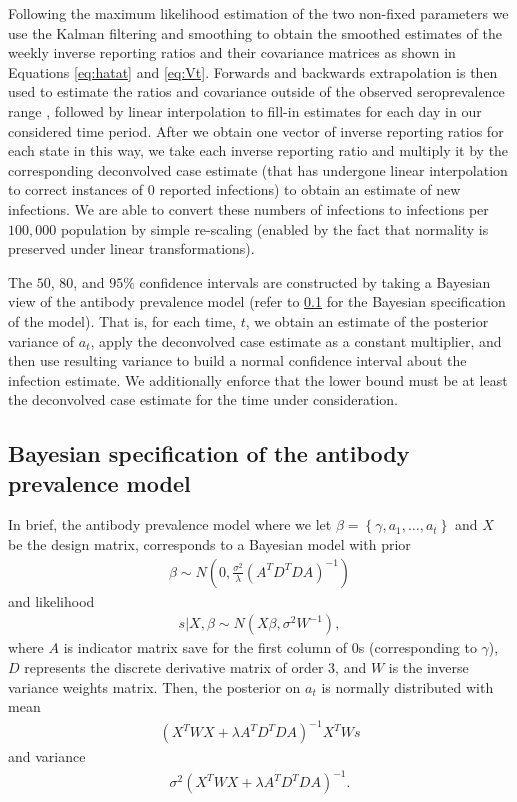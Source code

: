 Following the maximum likelihood estimation of the two non-fixed parameters we
use the Kalman filtering and smoothing to obtain the smoothed estimates of the
weekly inverse reporting ratios and their covariance matrices as shown in
Equations \ref{eq:hatat} and \ref{eq:Vt}. Forwards and backwards extrapolation
is then used to estimate the ratios and covariance outside of the observed
seroprevalence range \citep{durbin2012time}, followed by linear interpolation to
fill-in estimates for each day in our considered time period. After we obtain
one vector of inverse reporting ratios for each state in this way, we take each
inverse reporting ratio and multiply it by the corresponding deconvolved case
estimate (that has undergone linear interpolation to correct instances of $0$
reported infections) to obtain an estimate of new infections. We are able to
convert these numbers of infections to infections per $100,000$ population by
simple re-scaling (enabled by the fact that normality is preserved under linear
transformations).

The $50$, $80$, and $95\%$ confidence intervals are constructed by taking a
Bayesian view of the antibody prevalence model (refer to \ref{supp:bayeswaning} 
for the Bayesian specification of the model). 
That is, for each time, $t$, we obtain an estimate of the
posterior variance of $a_t$, apply the deconvolved case estimate as a constant
multiplier, and then use resulting variance to build a normal confidence
interval about the infection estimate. We additionally enforce that the lower
bound must be at least the deconvolved case estimate for the time under consideration.


\subsection{Bayesian specification of the antibody prevalence
model}\label{supp:bayeswaning} 
In brief, the antibody prevalence model where we let
$\beta = \left \{  \gamma, a_1,\dots, a_t \right \}$ and $X$ be the design
matrix, corresponds to a Bayesian model with prior 
\begin{align*}
    \beta \sim N \left( 0,  \frac{\sigma^2 }{ \lambda} \left( A^TD^TDA 
    \right)^{-1}  \right)
\end{align*} and likelihood 
\begin{align*}
    s|X,\beta \sim N \left( X\beta, \sigma^2W^{-1} \right),
\end{align*} where $A$ is indicator matrix save for the first column of $0$s 
(corresponding to $\gamma$), $D$ represents the discrete derivative matrix of 
order $3$, and $W$ is the inverse variance weights matrix. Then, the posterior 
on $a_t$ is normally distributed with mean 
\begin{align*}
    \left ( X^TWX + \lambda A^TD^TDA \right )^{-1}X^TWs
\end{align*} 
and variance 
\begin{align*}
    \sigma^2 (X^TWX + \lambda A^TD^TDA)^{-1}.
\end{align*}


